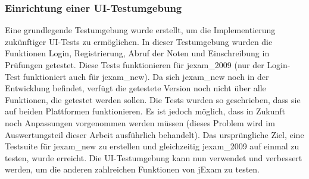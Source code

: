 \subsubsection{Einrichtung einer UI-Testumgebung}

Eine grundlegende Testumgebung wurde erstellt, um die Implementierung
zukünftiger UI-Tests zu ermöglichen. In dieser Testumgebung wurden die
Funktionen Login, Registrierung, Abruf der Noten und Einschreibung in
Prüfungen getestet. Diese Tests funktionieren für \Gls{jexam_2009} (nur
der Login-Test funktioniert auch für \Gls{jexam_new}). Da sich \Gls{jexam_new}
noch in der Entwicklung befindet, verfügt die getestete Version noch
nicht über alle Funktionen, die getestet werden sollen.  Die Tests
wurden so geschrieben, dass sie auf beiden Plattformen funktionieren.
Es ist jedoch möglich, dass in Zukunft noch Anpassungen vorgenommen
werden müssen (dieses Problem wird im Auswertungsteil dieser Arbeit
ausführlich behandelt). Das ursprüngliche Ziel, eine Testsuite für
\Gls{jexam_new} zu erstellen und gleichzeitig \Gls{jexam_2009} auf
einmal zu testen, wurde erreicht. Die UI-Testumgebung kann nun
verwendet und verbessert werden, um die anderen zahlreichen Funktionen
von jExam zu testen.

